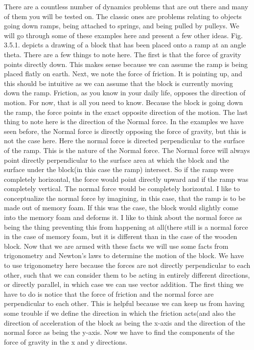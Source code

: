 There are a countless number of dynamics problems that are out there and many of them you will be tested on. The classic ones are problems relating to objects going down ramps, being attached to springs, and being pulled by pulleys. We will go through some of these examples here and present a few other ideas. Fig. 3.5.1. depicts a drawing of a block that has been placed onto a ramp at an angle theta. There are a few things to note here. The first is that the force of gravity points directly down. This makes sense because we can assume the ramp is being placed flatly on earth. Next, we note the force of friction. It is pointing up, and this should be intuitive as we can assume that the block is currently moving down the ramp. Friction, as you know in your daily life, opposes the direction of motion. For now, that is all you need to know. Because the block is going down the ramp, the force points in the exact opposite direction of the motion. The last thing to note here is the direction of the Normal force. In the examples we have seen before, the Normal force is directly opposing the force of gravity, but this is not the case here. Here the normal force is directed perpendicular to the surface of the ramp. This is the nature of the Normal force. The Normal force will always point directly perpendicular to the surface area at which the block and the surface under the block(in this case the ramp) intersect. So if the ramp were completely horizontal, the force would point directly upward and if the ramp was completely vertical. The normal force would be completely horizontal. I like to conceptualize the normal force by imagining, in this case, that the ramp is to be made out of memory foam. If this was the case, the block would slightly come into the memory foam and deforms it. I like to think about the normal force as being the thing preventing this from happening at all(there still is a normal force in the case of memory foam, but it is different than in the case of the wooden block. Now that we are armed with these facts we will use some facts from trigonometry and Newton's laws to determine the motion of the block. We have to use trigonometry here because the forces are not directly perpendicular to each other, such that we can consider them to be acting in entirely different directions, or directly parallel, in which case we can use vector addition. The first thing we have to do is notice that the force of friction and the normal force are perpendicular to each other. This is helpful because we can keep us from having some trouble if we define the direction in which the friction acts(and also the direction of acceleration of the block as being the x-axis and the direction of the normal force as being the y-axis. Now we have to find the components of the force of gravity in the x and y directions. 
